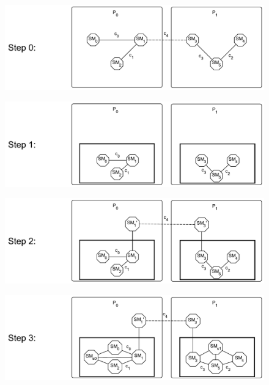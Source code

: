 \documentclass{article}
\begin{document}
	\begin{figure}[ht!]
		\center
		\includegraphics[scale=0.39]{figures/state-machines/distributed-protocol-model-transformation0.pdf}
	\end{figure}
	\begin{figure}[ht!]
		\center
		\includegraphics[scale=0.39]{figures/state-machines/distributed-protocol-model-transformation1.pdf}
	\end{figure}
	\begin{figure}[ht!]
		\center
		\includegraphics[scale=0.39]{figures/state-machines/distributed-protocol-model-transformation2.pdf}
	\end{figure}
	\begin{figure}[ht!]
		\center
		\includegraphics[scale=0.39]{figures/state-machines/distributed-protocol-model-transformation3.pdf}
	\end{figure}
\end{document}
